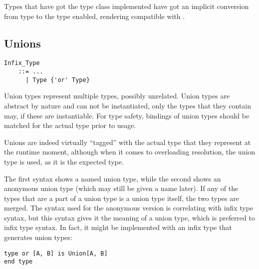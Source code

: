Types  that have got the  type class implemented have got an implicit conversion from type  to the type  enabled, rendering  compatible with .





\subsection{Unions}
\label{sec:unions}

\grammar\begin{lstlisting}
Infix_Type
    ::= ...
      | Type {'or' Type}
\end{lstlisting}

Union types represent multiple types, possibly unrelated. Union types are abstract by nature and can not be instantiated, only the types that they contain may, if these are instantiable. For type safety, bindings of union types should be matched for the actual type prior to usage. 

Unions are indeed virtually ``tagged'' with the actual type that they represent at the runtime moment, although when it comes to overloading resolution, the union type is used, as it is the expected type. 

The first syntax shows a named union type, while the second shows an anonymous union type (which may still be given a name later). If any of the types that are a part of a union type is a union type itself, the two types are merged. The syntax used for the anonymous version is correlating with infix type syntax, but this syntax gives it the meaning of a union type, which is preferred to infix type syntax. In fact, it might be implemented with an infix type that generates union types:

\begin{lstlisting}
type or [A, B] is Union[A, B] 
end type
\end{lstlisting}


